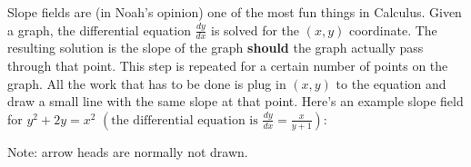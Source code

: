 \documentclass[../revisedmain.tex]{subfiles}
\begin{document}
	Slope fields are (in Noah's opinion) one of the most fun things in Calculus. Given a graph, the differential equation $\displaystyle\frac{dy}{dx}$ is solved for the $(x,y)$ coordinate. The resulting solution is the slope of the graph \textbf{should} the graph actually pass through that point. This step is repeated for a certain number of points on the graph. All the work that has to be done is plug in $(x,y)$ to the equation and draw a small line with the same slope at that point. Here's an example slope field for $y^2+2y=x^2$ $\left(\text{the differential equation is } \displaystyle\frac{dy}{dx}=\displaystyle\frac{x}{y+1}\right)$:
	\begin{center}
		\def\length{sqrt(1+(x-y)^2)}
		\newline Note: arrow heads are normally not drawn.
	\end{center}
\end{document}

